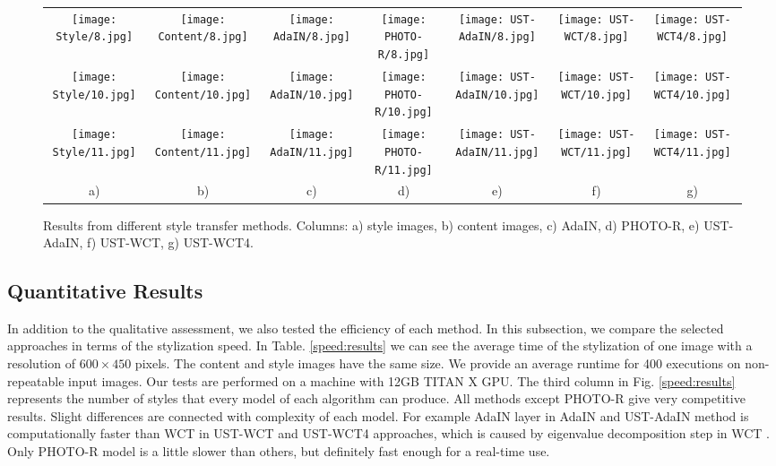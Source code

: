 \documentclass{llncs}
\begin{document}
\begin{figure}[!ht]
\begin{tabular}{ccccccc}
\texttt{[image: Style/8.jpg]}&
\texttt{[image: Content/8.jpg]}&
\texttt{[image: AdaIN/8.jpg]}&
\texttt{[image: PHOTO-R/8.jpg]}&
\texttt{[image: UST-AdaIN/8.jpg]}&
\texttt{[image: UST-WCT/8.jpg]}&
\texttt{[image: UST-WCT4/8.jpg]}\\


\texttt{[image: Style/10.jpg]}&
\texttt{[image: Content/10.jpg]}&
\texttt{[image: AdaIN/10.jpg]}&
\texttt{[image: PHOTO-R/10.jpg]}&
\texttt{[image: UST-AdaIN/10.jpg]}&
\texttt{[image: UST-WCT/10.jpg]}&
\texttt{[image: UST-WCT4/10.jpg]}\\

\texttt{[image: Style/11.jpg]}&
\texttt{[image: Content/11.jpg]}&
\texttt{[image: AdaIN/11.jpg]}&
\texttt{[image: PHOTO-R/11.jpg]}&
\texttt{[image: UST-AdaIN/11.jpg]}&
\texttt{[image: UST-WCT/11.jpg]}&
\texttt{[image: UST-WCT4/11.jpg]}\\
a)&b)&c)&d)&e)&f)&g)\\
\end{tabular}
    \caption{Results from different style transfer methods. Columns: a) style images, b) content images, c) AdaIN, d) PHOTO-R, e) UST-AdaIN, f) UST-WCT, g) UST-WCT4. \label{visual:results}}
\end{figure}
%
\subsection{Quantitative Results}
%

In addition to the qualitative assessment, we also tested the efficiency of each method. In this subsection, we compare the selected approaches in terms of the stylization speed. In Table. \ref{speed:results} we can see the average time of the stylization of one image with a resolution of $600 \times 450$ pixels. The content and style images have the same size. We provide an average runtime for 400 executions on non-repeatable input images. Our tests are performed on a machine with 12GB TITAN X GPU. The third column in Fig. \ref{speed:results} represents the number of styles that every model of each algorithm can produce. All methods except PHOTO-R give very competitive results. Slight differences are connected with complexity of each model. For example AdaIN layer in AdaIN and UST-AdaIN method is computationally faster than WCT in UST-WCT and UST-WCT4 approaches, which is caused by eigenvalue decomposition step in WCT \cite{universal:style}. Only PHOTO-R model is a little slower than others, but definitely fast enough for a real-time use.
\end{document}
